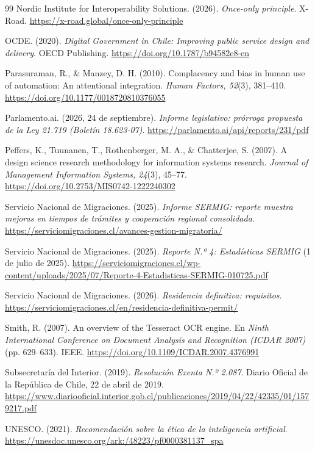 \documentclass[11pt,a4paper]{article}
\begin{document}
\begin{thebibliography}{99}
Nordic Institute for Interoperability Solutions. (2026). \emph{Once-only principle}. X-Road. \url{https://x-road.global/once-only-principle}

OCDE. (2020). \emph{Digital Government in Chile: Improving public service design and delivery}. OECD Publishing. \url{https://doi.org/10.1787/b94582e8-en}

Parasuraman, R., \& Manzey, D. H. (2010). Complacency and bias in human use of automation: An attentional integration. \emph{Human Factors, 52}(3), 381--410. \url{https://doi.org/10.1177/0018720810376055}

Parlamento.ai. (2026, 24 de septiembre). \emph{Informe legislativo: prórroga propuesta de la Ley 21.719 (Boletín 18.623-07)}. \url{https://parlamento.ai/api/reports/231/pdf}

Peffers, K., Tuunanen, T., Rothenberger, M. A., \& Chatterjee, S. (2007). A design science research methodology for information systems research. \emph{Journal of Management Information Systems, 24}(3), 45--77. \url{https://doi.org/10.2753/MIS0742-1222240302}

Servicio Nacional de Migraciones. (2025). \emph{Informe SERMIG: reporte muestra mejoras en tiempos de trámites y cooperación regional consolidada}. \url{https://serviciomigraciones.cl/avances-gestion-migratoria/}

Servicio Nacional de Migraciones. (2025). \emph{Reporte N.º 4: Estadísticas SERMIG} (1 de julio de 2025). \url{https://serviciomigraciones.cl/wp-content/uploads/2025/07/Reporte-4-Estadisticas-SERMIG-010725.pdf}

Servicio Nacional de Migraciones. (2026). \emph{Residencia definitiva: requisitos}. \url{https://serviciomigraciones.cl/en/residencia-definitiva-permit/}

Smith, R. (2007). An overview of the Tesseract OCR engine. En \emph{Ninth International Conference on Document Analysis and Recognition (ICDAR 2007)} (pp. 629--633). IEEE. \url{https://doi.org/10.1109/ICDAR.2007.4376991}

Subsecretaría del Interior. (2019). \emph{Resolución Exenta N.º 2.087}. Diario Oficial de la República de Chile, 22 de abril de 2019. \url{https://www.diariooficial.interior.gob.cl/publicaciones/2019/04/22/42335/01/1579217.pdf}

UNESCO. (2021). \emph{Recomendación sobre la ética de la inteligencia artificial}. \url{https://unesdoc.unesco.org/ark:/48223/pf0000381137_spa}


\end{thebibliography}
\end{document}
